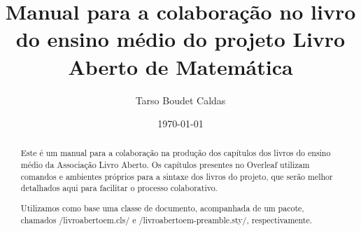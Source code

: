 \documentclass{article}
\title{Manual para a colaboração no livro do ensino médio do projeto
	Livro Aberto de Matemática}
\author{Tarso Boudet Caldas}
\date{\today}
\begin{document}
\maketitle

\begin{abstract}
	Este é um manual para a colaboração na produção dos capítulos dos
	livros do ensino médio da Associação Livro Aberto. Os capítulos
	presentes no Overleaf utilizam comandos e ambientes próprios para a
	sintaxe dos livros do projeto, que serão melhor detalhados aqui para
	facilitar o processo colaborativo.

	Utilizamos como base uma classe de documento, acompanhada de um pacote,
	chamados \latexinline/livroabertoem.cls/ e
	\latexinline/livroabertoem-preamble.sty/, respectivamente.
\end{abstract}


\tableofcontents\clearpage









\nocite{*}
\printbibliography
\end{document}
